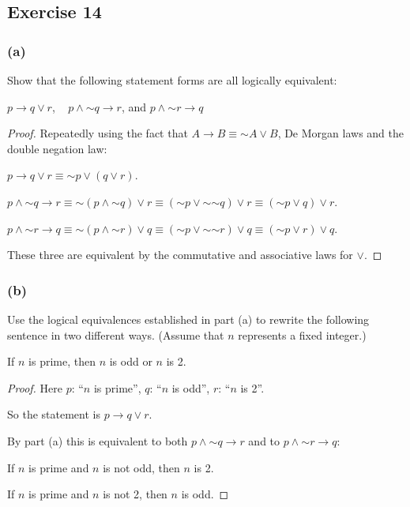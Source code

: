 \documentclass[14pt]{extarticle}
\begin{document}
\subsection{Exercise 14} 
\subsubsection{(a)} 
Show that the following statement forms are all logically equivalent:

$p \to q \vee r$, \,\,\, $p \wedge {\sim q} \to r$, and $p \wedge {\sim r} \to q$

\begin{proof} 
Repeatedly using the fact that $A \to B \equiv {\sim A} \vee B$, De Morgan laws and the double negation law:

$p \to q \vee r \equiv {\sim p} \vee (q \vee r)$.

$p \wedge {\sim q} \to r \equiv {\sim (p \wedge {\sim q}) \vee r} \equiv ({\sim p} \vee {\sim {\sim q}}) \vee r \equiv ({\sim p} \vee q) \vee r$.

$p \wedge {\sim r} \to q \equiv {\sim (p \wedge {\sim r}) \vee q} \equiv ({\sim p} \vee {\sim {\sim r}}) \vee q \equiv ({\sim p} \vee r) \vee q$.

These three are equivalent by the commutative and associative laws for $\vee$.
\end{proof}

\subsubsection{(b)} 
Use the logical equivalences established in part (a) to rewrite the following sentence in two different ways. (Assume that $n$
represents a fixed integer.)

\begin{center} 
If $n$ is prime, then $n$ is odd or $n$ is 2. 
\end{center}

\begin{proof} 
Here $p$: ``$n$ is prime'', $q$: ``$n$ is odd'', $r$: ``$n$ is
2''.

So the statement is $p \to q \vee r$.

By part (a) this is equivalent to both $p \wedge {\sim q} \to r$ and to $p \wedge {\sim r} \to q$:

If $n$ is prime and $n$ is not odd, then $n$ is 2.

If $n$ is prime and $n$ is not 2, then $n$ is odd. 
\end{proof}
\end{document}
